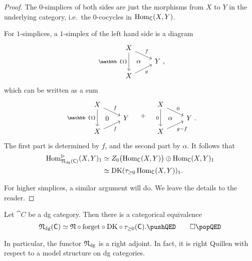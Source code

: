 \begin{proof}
    The $0$-simplices of both sides are just 
    the morphisms from $X$ to $Y$ in the underlying category,
    i.e.\ the $0$-cocycles in $\operatorname{Hom}_{\textup{\textsf{C}}}(X,Y)$.

    For $1$-simplices, a $1$-simplex of the left hand side is a diagram 
    \[\begin{tikzcd}[row sep=.5em]
        X \ar[dd,"\mathbb{1}"'] \ar[dr,"f"] \\
        \ \ar[r,phantom,pos=.3,"\alpha"] & Y \rlap{\ ,} \\
        X \ar[ur,"g"']
    \end{tikzcd}\]
    which can be written as a sum 
    \[\begin{tikzcd}[row sep=.5em]
        X \ar[dd,"\mathbb{1}"'] \ar[dr,"f"] \\
        \ \ar[r,phantom,pos=.3,"0"] & Y \\
        X \ar[ur,"f"']
    \end{tikzcd} \quad+\quad \begin{tikzcd}[row sep=.5em]
        X \ar[dd,"0"'] \ar[dr,"0"] \\
        \ \ar[r,phantom,pos=.3,"\alpha"] & Y \rlap{\ .} \\
        X \ar[ur,"g-f"']
    \end{tikzcd}\]
    The first part is determined by $f$, and the second part by $\alpha$.
    It follows that 
    \[ \begin{aligned}
        \operatorname{Hom}_{\mathfrak{N}_{\mathrm{dg}}(\textup{\textsf{C}})}^{\vartriangleright}(X,Y)_1
        &\simeq Z_0\bigl(\operatorname{Hom}_{\textup{\textsf{C}}}(X,Y)\bigr) \oplus \operatorname{Hom}_{\textup{\textsf{C}}}(X,Y)_1 \\
        &\simeq \operatorname{DK}(\tau_{\geq0}\operatorname{Hom}_{\textup{\textsf{C}}}(X,Y))_1.
    \end{aligned} \]

    For higher simplices, a similar argument will do.
    We leave the details to the reader.
\end{proof}

\begin{corollary}
    Let $\cat{C}$ be a dg category. Then there is a categorical equivalence
    \[\Ndg(\cat{C})\simeq
    \mathfrak{N}\circ\mathrm{forget}\circ{\operatorname{DK}}\circ\tau_{\geq0}(\cat{C}).
    \thmqedhere \] 
\end{corollary}

In particular, the functor $\mathfrak{N}_{\mathrm{dg}}$ is a right adjoint.
In fact, it is right Quillen with respect to a model structure on dg categories.

